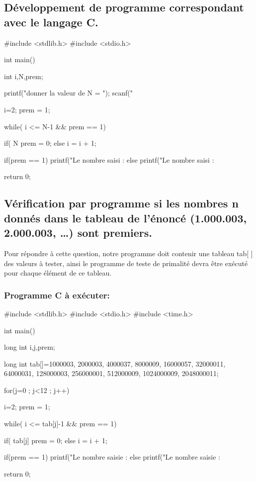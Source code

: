 \documentclass[12pt]{article}
\begin{document}
\subsection{Développement de programme correspondant avec le langage C.}


\begin{sql}
#include <stdlib.h>
#include <stdio.h>

int main()
{

	int i,N,prem;


	printf("donner la valeur de N = ");
	scanf("%

	i=2;
	prem = 1;

	while( i <= N-1 && prem == 1){

		if( N%
			prem = 0;
		else
			i = i + 1;
	}

	if(prem == 1)
    {
        printf("Le nombre saisi : %
    }
	else{
        printf("Le nombre saisi : %
	}


return 0;

}

\end{sql}



\subsection{Vérification par programme  si  les  nombres  n  donnés  dans  le tableau de l'énoncé (1.000.003, 2.000.003, …) sont premiers.}

Pour répondre à cette question, notre programme doit contenir une tableau tab[ ] des valeurs à tester, ainsi le programme de teste de primalité devra être exécuté pour chaque élément de ce tableau.

\subsubsection{Programme C à exécuter:}

\begin{sql}
#include <stdlib.h>
#include <stdio.h>
#include <time.h>

int main()
{
	long int i,j,prem;

	long int tab[]={1000003, 2000003, 4000037, 8000009, 16000057, 32000011, 64000031, 128000003, 256000001, 512000009,	1024000009,	2048000011};

for(j=0 ; j<12 ; j++)
{
	i=2;
	prem = 1;
	
	while( i <= tab[j]-1 && prem == 1){

		if( tab[j]%
			prem = 0;
		else
			i = i + 1;
	}

	if(prem == 1)
    {
        printf("Le nombre saisie : %
    }
	else{
        printf("Le nombre saisie : %
	}
}

return 0;
}
\end{sql}
\end{document}
